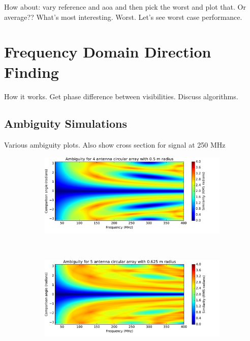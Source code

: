 How about: vary reference and aoa and then pick the worst and plot that. Or average?? What's most interesting. Worst. Let's see worst case performance. 

\section{Frequency Domain Direction Finding}
How it works. Get phase difference between visibilities. 
Discuss algorithms. 

\subsection{Ambiguity Simulations}
Various ambiguity plots. 
Also show cross section for signal at 250 MHz
\begin{figure}
  \centering
  \begin{subfigure}{\textwidth}
    \centering
    \includegraphics[width=\textwidth, clip=true, trim = 0 15 50 0]{ambiguity01}
  \end{subfigure}\\[1em]
  \begin{subfigure}{\textwidth}
    \centering
    \includegraphics[width=\textwidth, clip=true, trim = 0 15 50 0]{ambiguity02}
  \end{subfigure}\\[1em]
  \begin{subfigure}{\textwidth}

\end{subfigure}
\end{figure}
